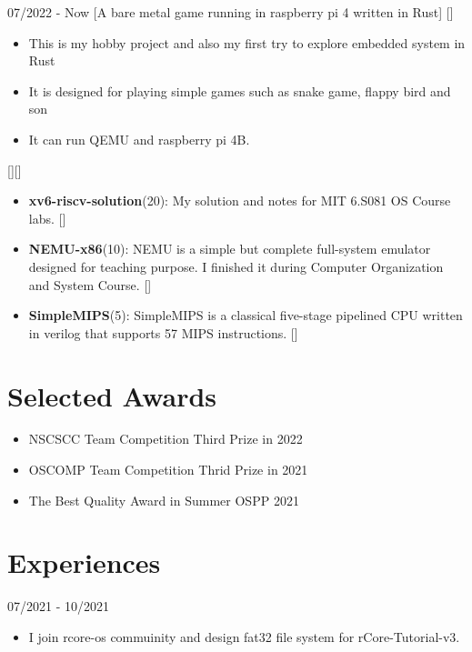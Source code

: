 \documentclass{chicv}
\begin{document}
  {07/2022 - Now}
  [A bare metal game running in raspberry pi 4 written in Rust]
  []
  \begin{itemize}
    \item This is my hobby project and also my first try to explore embedded system in Rust 
    \item It is designed for playing simple games such as snake game, flappy bird and son 
    \item It can run QEMU and raspberry pi 4B.
  \end{itemize}

[][]
\begin{itemize}
  \item \textbf{xv6-riscv-solution}(20):
  {\small My solution and notes for MIT 6.S081 OS Course labs.} []
  \item \textbf{NEMU-x86}(10):
  {\small NEMU is a simple but complete full-system emulator designed for teaching purpose. I finished it during Computer Organization and System Course.}  []
  \item \textbf{SimpleMIPS}(5):
  {\small SimpleMIPS is a classical five-stage pipelined CPU written in verilog that supports 57 MIPS instructions. } []
\end{itemize}

\section{Selected Awards}
\begin{itemize}
  \item NSCSCC Team Competition Third Prize in 2022
  \item OSCOMP Team Competition Thrid Prize in 2021
  \item The Best Quality Award in Summer OSPP 2021
\end{itemize}

\section{Experiences}
{07/2021 - 10/2021}
\begin{itemize}
  \item I join rcore-os commuinity and design fat32 file system for rCore-Tutorial-v3.
\end{itemize}
\end{document}

